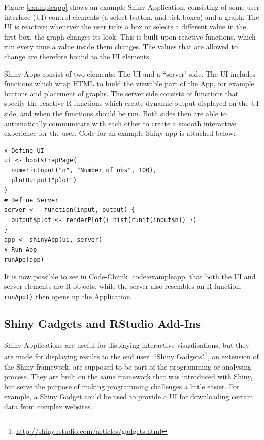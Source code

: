 \documentclass[12pt]{article} %
\newcommand{\li}{\lstinline}
\begin{document}
Figure \ref{exampleapp} shows an example Shiny Application, consisting of some user interface (UI) control elements (a select button, and tick boxes) and a graph. The UI is reactive; whenever the user ticks a box or selects a different value in the first box, the graph changes its look. This is built upon reactive functions, which run every time a value inside them changes. The values that are allowed to change are therefore bound to the UI elements.

Shiny Apps consist of two elements: The UI and a ``server" side. The UI includes functions which wrap HTML to build the viewable part of the App, for example buttons and placement of graphs. The server side consists of functions that specify the reactive R functions which create dynamic output displayed on the UI side, and when the functions should be run. Both sides then are able to automatically communicate with each other to create a smooth interactive experience for the user. Code for an example Shiny app is attached below:

\begin{lstlisting}[caption = Example code for a Shiny Application\cite{w2}., label = code:exampleapp]
# Define UI
ui <- bootstrapPage(
  numericInput("n", "Number of obs", 100),
  plotOutput("plot")
)
# Define Server
server <-  function(input, output) {
  output$plot <- renderPlot({ hist(runif(input$n)) })
}
app <- shinyApp(ui, server)
# Run App
runApp(app)
\end{lstlisting}

It is now possible to see in Code-Chunk \ref{code:exampleapp} that both the UI and server elements are R objects, while the server also resembles an R function. \li{runApp()} then opens up the Application.

\subsection{Shiny Gadgets and RStudio Add-Ins}
\label{shinyrstudiochapter}

Shiny Applications are useful for displaying interactive visualisations, but they are made for displaying results to the end user. ``Shiny Gadgets"\footnote{\url{http://shiny.rstudio.com/articles/gadgets.html}}, an extension of the Shiny framework, are supposed to be part of the programming or analysing process. They are built on the same framework that was introduced with Shiny, but serve the purpose of making programming challenges a little easier. For example, a Shiny Gadget could be used to provide a UI for downloading certain data from complex websites. 
\end{document}
